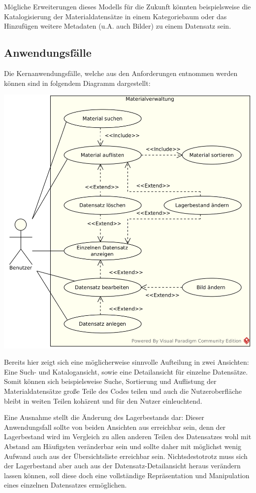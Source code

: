 Mögliche Erweiterungen dieses Modells für die Zukunft könnten beispielsweise die Katalogisierung der Materialdatensätze
in einem Kategoriebaum oder das Hinzufügen weitere Metadaten (u.A. auch Bilder) zu einem Datensatz sein.

\newpage
\subsection{Anwendungsfälle}
Die Kernanwendungsfälle, welche aus den Anforderungen entnommen werden können sind in folgendem Diagramm dargestellt:

\begin{center}
\noindent\includegraphics[width=150mm,keepaspectratio]{images/02-anwendungsfaelle.png}
\end{center}

Bereits hier zeigt sich eine möglicherweise sinnvolle Aufteilung in zwei Ansichten: Eine Such- und Katalogansicht,
sowie eine Detailansicht für einzelne Datensätze. Somit können sich beispielsweise Suche, Sortierung und Auflistung der
Materialdatensätze große Teile des Codes teilen und auch die Nutzeroberfläche bleibt in weiten Teilen kohärent und
für den Nutzer einleuchtend.

Eine Ausnahme stellt die Änderung des Lagerbestands dar: Dieser Anwendungsfall sollte von
beiden Ansichten aus erreichbar sein, denn der Lagerbestand wird im Vergleich zu allen anderen Teilen des Datensatzes
wohl mit Abstand am Häufigsten veränderbar sein und sollte daher mit möglichst wenig Aufwand auch aus der Übersichtsliste
erreichbar sein. Nichtsdestotrotz muss sich der Lagerbestand aber auch aus der Datensatz-Detailansicht heraus verändern
lassen können, soll diese doch eine vollständige Repräsentation und Manipulation eines einzelnen Datensatzes ermöglichen.

